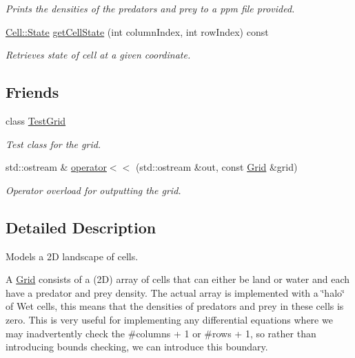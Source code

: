 \begin{DoxyCompactItemize}
$$\begin{DoxyCompactList}\small\item\em Prints the densities of the predators and prey to a ppm file provided. \end{DoxyCompactList}\item 
\hyperlink{class_cell_a21d74a2efcb79c93e5649b06a50b7cf5}{Cell\+::\+State} \hyperlink{class_grid_a425801f2747d6be34c10eb6535ab0829}{get\+Cell\+State} (int column\+Index, int row\+Index) const
\begin{DoxyCompactList}\small\item\em Retrieves state of cell at a given coordinate. \end{DoxyCompactList}\end{DoxyCompactItemize}
\subsection*{Friends}
\begin{DoxyCompactItemize}
\item 
class \hyperlink{class_grid_ac2cfb15a02d10acf2c124625070a2de8}{Test\+Grid}
\begin{DoxyCompactList}\small\item\em Test class for the grid. \end{DoxyCompactList}\item 
std\+::ostream \& \hyperlink{class_grid_a3513576c9cced69b185e4be8fe248e8c}{operator$<$$<$} (std\+::ostream \&out, const \hyperlink{class_grid}{Grid} \&grid)
\begin{DoxyCompactList}\small\item\em Operator overload for outputting the grid. \end{DoxyCompactList}\end{DoxyCompactItemize}


\subsection{Detailed Description}
Models a 2D landscape of cells. 

A \hyperlink{class_grid}{Grid} consists of a (2D) array of cells that can either be land or water and each have a predator and prey density. The actual array is implemented with a \char`\"{}halo\char`\"{} of Wet cells, this means that the densities of predators and prey in these cells is zero. This is very useful for implementing any differential equations where we may inadvertently check the \#columns + 1 or \#rows + 1, so rather than introducing bounds checking, we can introduce this boundary. 

